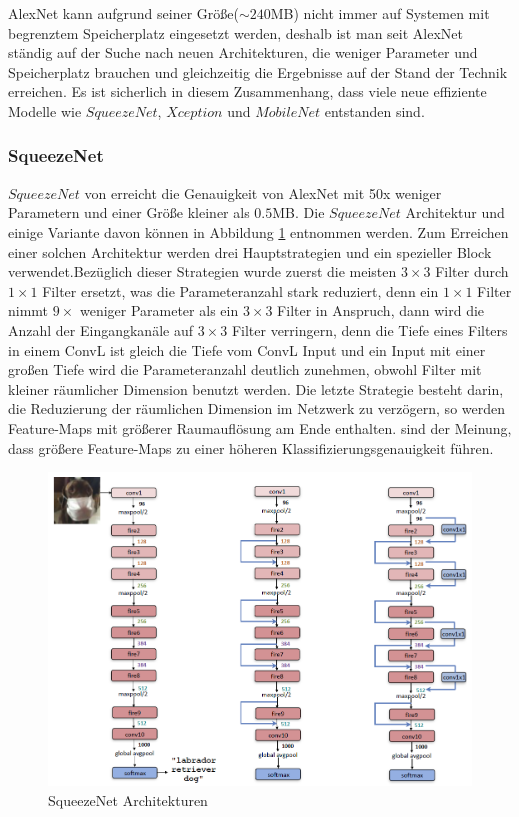 \documentclass[12pt,a4paper]{scrartcl}
\numberwithin{equation}{section}
\begin{document}
AlexNet kann aufgrund seiner Größe($\sim240$MB) nicht immer auf Systemen mit begrenztem Speicherplatz eingesetzt werden, deshalb ist man seit AlexNet ständig auf der Suche nach neuen Architekturen, die weniger Parameter und Speicherplatz brauchen und  gleichzeitig die Ergebnisse auf der Stand der Technik erreichen. Es ist sicherlich  in diesem Zusammenhang, dass viele neue effiziente Modelle wie $ SqueezeNet $, $ Xception $ und $ MobileNet $ entstanden sind.


\subsubsection{SqueezeNet}
$ SqueezeNet $ von \cite[Han et al]{SqueezeNet} erreicht die Genauigkeit von AlexNet mit 50x weniger Parametern und  einer Größe kleiner als $ 0.5$MB. Die $ SqueezeNet $ Architektur und einige Variante davon können in Abbildung \ref{fig:SqueezeNet} entnommen werden. Zum Erreichen einer solchen Architektur werden drei Hauptstrategien und ein spezieller Block verwendet.Bezüglich dieser Strategien wurde zuerst die meisten $ 3\times3 $ Filter durch $ 1\times1 $ Filter ersetzt, was die Parameteranzahl stark reduziert, denn ein $ 1\times1 $ Filter nimmt $ 9\times $ weniger Parameter als ein $ 3\times3 $ Filter in Anspruch, dann wird die Anzahl der Eingangkanäle auf $ 3\times3 $ Filter verringern, denn die Tiefe eines Filters in einem \ac{ConvL} ist gleich die Tiefe vom \ac{ConvL} Input und ein Input mit einer großen Tiefe wird die Parameteranzahl deutlich zunehmen, obwohl Filter mit kleiner räumlicher Dimension benutzt werden. Die letzte Strategie besteht darin, die Reduzierung der räumlichen Dimension im Netzwerk zu verzögern, so werden Feature-Maps mit größerer Raumauflösung am Ende enthalten. \cite[Song Han et al]{SqueezeNet} sind der Meinung, dass größere Feature-Maps zu einer höheren Klassifizierungsgenauigkeit führen. 

\begin{figure}[h]
	\centering
	\includegraphics[width=\textwidth ]{squeezenet}
	\caption{ SqueezeNet Architekturen \cite{SqueezeNet} }
	\label{fig:SqueezeNet}
\end{figure}
\end{document}
